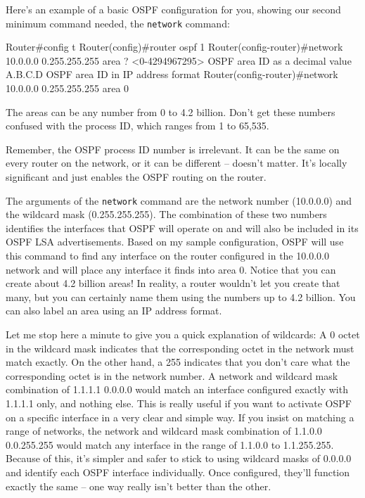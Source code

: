 Here's an example of a basic OSPF configuration for you, showing our
second minimum command needed, the \texttt{network} command:

\begin{cli}
Router#config t
Router(config)#router ospf 1
Router(config-router)#network 10.0.0.0 0.255.255.255 area ?
  <0-4294967295>  OSPF area ID as a decimal value
  A.B.C.D         OSPF area ID in IP address format
Router(config-router)#network 10.0.0.0 0.255.255.255 area 0
\end{cli}

\begin{note}
The areas can be any number from 0 to 4.2 billion.
Don't get these numbers confused with the process ID, which ranges from 1 to 65,535.
\end{note}

Remember, the OSPF process ID number is irrelevant. It can be the same
on every router on the network, or it can be different -- doesn't matter.
It's locally significant and just enables the OSPF routing on the
router.

The arguments of the \texttt{network} command are the network number
(10.0.0.0) and the wildcard mask (0.255.255.255). The combination of
these two numbers identifies the interfaces that OSPF will operate on
and will also be included in its OSPF LSA advertisements. Based on my
sample configuration, OSPF will use this command to find any interface
on the router configured in the 10.0.0.0 network and will place any
interface it finds into area 0.
\protect\hypertarget{c18.xhtmlux5cux23Page_755}{}{}Notice that you can
create about 4.2 billion areas! In reality, a router wouldn't let you
create that many, but you can certainly name them using the numbers up
to 4.2 billion. You can also label an area using an IP address format.

Let me stop here a minute to give you a quick explanation of wildcards:
A 0 octet in the wildcard mask indicates that the corresponding octet in
the network must match exactly. On the other hand, a 255 indicates that
you don't care what the corresponding octet is in the network number. A
network and wildcard mask combination of 1.1.1.1 0.0.0.0 would match an
interface configured exactly with 1.1.1.1 only, and nothing else. This
is really useful if you want to activate OSPF on a specific interface in
a very clear and simple way. If you insist on matching a range of
networks, the network and wildcard mask combination of 1.1.0.0
0.0.255.255 would match any interface in the range of 1.1.0.0 to
1.1.255.255. Because of this, it's simpler and safer to stick to using
wildcard masks of 0.0.0.0 and identify each OSPF interface individually.
Once configured, they'll function exactly the same -- one way really
isn't better than the other.

